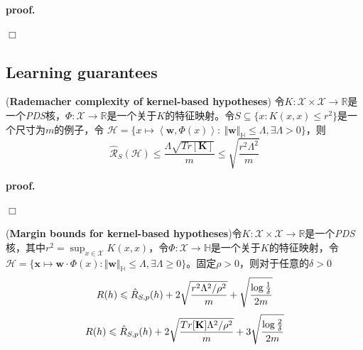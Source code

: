 \textbf{proof.}\hspace{1em} 

$\Box$

\subsection*{Learning guarantees}

\begin{mdframed}
    \begin{theorem}
        (\textbf{Rademacher complexity of kernel-based hypotheses}) 令$K:\mathcal{X}\times \mathcal{X}\rightarrow \mathbb{R}$是一个\textsl{PDS}核，$\Phi:\mathcal{X}\rightarrow \mathbb{R}$是一个关于$K$的特征映射。令$S\subseteq \{x:K(x,x)\leqslant r^2\}$是一个尺寸为$m$的例子，令
        $\mathcal{H}=\{x\mapsto \left<\mathbf{w},\Phi(x)\right>:\ \Vert \mathbf{w}\Vert_{\mathbb{H}}\leqslant \Lambda,\exists \Lambda>0\}$，则
        \begin{equation}
            \hat{\mathcal{R}}_S(\mathcal{H})\leqslant \frac{\Lambda\sqrt{Tr[\mathbf{K}]}}{m}\leqslant \sqrt{\frac{r^2\Lambda^2}{m}}
        \end{equation}
    \end{theorem}
\end{mdframed}

\textbf{proof.}\hspace{1em} 

$\Box$

\begin{mdframed}
    \begin{corollary}
        (\textbf{Margin bounds for kernel-based hypotheses})令$K:\mathcal{X}\times \mathcal{X}\rightarrow\mathbb{R}$是一个\textsl{PDS}核，其中$r^2=\sup_{x\in \mathcal{X}}K(x,x)$，令$\Phi:\mathcal{X}\rightarrow \mathbb{H}$是一个关于$K$的特征映射，令$\mathcal{H}=\{\mathbf{x}\mapsto \mathbf{w}\cdot \Phi(x):\Vert \mathbf{w}\Vert_\mathbb{H}\leqslant \Lambda,\exists \Lambda\geqslant 0\}$。固定$\rho>0$，则对于任意的$\delta>0$
        \begin{equation}
            R(h)\leqslant \hat{R}_{S,p}(h)+2\sqrt{\frac{r^2\Lambda^2/\rho^2}{m}}+\sqrt{\frac{\log \frac{1}{\delta}}{2m}} \\
        \end{equation}
        \begin{equation}
            R(h)\leqslant \hat{R}_{S,p}(h)+2\sqrt{\frac{Tr[\mathbf{K}]\Lambda^2/\rho^2}{m}}+3\sqrt{\frac{\log \frac{2}{\delta}}{2m}} \\
        \end{equation}
    \end{corollary}
\end{mdframed}


